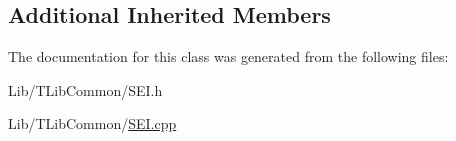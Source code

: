 \subsection*{Additional Inherited Members}


The documentation for this class was generated from the following files\+:\begin{DoxyCompactItemize}
\item 
Lib/\+T\+Lib\+Common/S\+E\+I.\+h\item 
Lib/\+T\+Lib\+Common/\hyperlink{_s_e_i_8cpp}{S\+E\+I.\+cpp}\end{DoxyCompactItemize}
